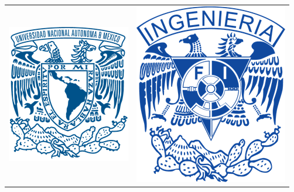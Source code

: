 \documentclass[letter,12pt]{article} %
\begin{document}
\thispagestyle{empty} %
{\small
\begin{tabular}{
 p{}  p{}}%
	\includegraphics[scale=0.55]{imagenes/UNAM.png} & \includegraphics[scale=0.43]{imagenes/UNAMFI.png}


\end{tabular} %
}
\end{document}
